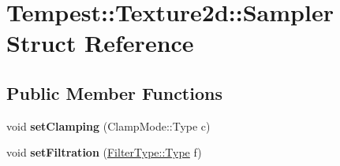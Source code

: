 \hypertarget{struct_tempest_1_1_texture2d_1_1_sampler}{\section{Tempest\+:\+:Texture2d\+:\+:Sampler Struct Reference}
\label{struct_tempest_1_1_texture2d_1_1_sampler}
}
\subsection*{Public Member Functions}
\begin{DoxyCompactItemize}
\item 
\hypertarget{struct_tempest_1_1_texture2d_1_1_sampler_a6c1a439fa9727919a5a2a00768e0b381}{void {\bfseries set\+Clamping} (Clamp\+Mode\+::\+Type c)}\label{struct_tempest_1_1_texture2d_1_1_sampler_a6c1a439fa9727919a5a2a00768e0b381}

\item 
\hypertarget{struct_tempest_1_1_texture2d_1_1_sampler_a2871d087a56147089ec33921e2991c9d}{void {\bfseries set\+Filtration} (\hyperlink{struct_tempest_1_1_abstract_texture_1_1_filter_type_aa28dcbdc63244fe43cfb7258f6996978}{Filter\+Type\+::\+Type} f)}\label{struct_tempest_1_1_texture2d_1_1_sampler_a2871d087a56147089ec33921e2991c9d}

\end{DoxyCompactItemize}
